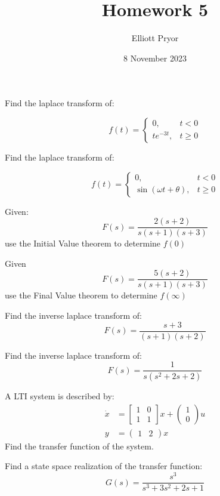 \documentclass[11pt]{article}
\title{Homework 5}
\author{Elliott Pryor}
\date{8 November 2023}
\begin{document}
\maketitle

Find the laplace transform of:

$$
f(t) = \begin{cases}
    0, & t<0\\
    te^{-3t}, & t \geq 0
\end{cases}
$$
\soln




Find the laplace transform of:

$$
f(t) = \begin{cases}
    0, & t<0\\
    \sin(\omega t + \theta), & t \geq 0
\end{cases}
$$
\soln





Given:
$$
F(s) = \frac{2(s + 2)}{s (s+1) (s+3)}
$$
use the Initial Value theorem to determine $f(0)$
\soln












Given
$$
F(s) = \frac{5(s+2)}{s(s+1)(s+3)}
$$
use the Final Value theorem to determine $f(\infty)$
\soln












Find the inverse laplace transform of:
$$
F(s) = \frac{s + 3}{(s+1)(s+2)}
$$
\soln








Find the inverse laplace transform of:
$$
F(s) = \frac{1}{s(s^2 + 2s +2)}
$$
\soln








A LTI system is described by:
\begin{align*}
    \dot{x} &= \begin{bmatrix}
        1&0\\1&1
    \end{bmatrix}x + \begin{pmatrix}
        1\\0
    \end{pmatrix}u \\
    y &= \begin{pmatrix}
        1 & 2
    \end{pmatrix} x
\end{align*}
Find the transfer function of the system.

\soln





Find a state space realization of the transfer function:
$$
G(s) = \frac{s^3}{s^3 + 3s^2 + 2s + 1}
$$
\soln
\end{document}

